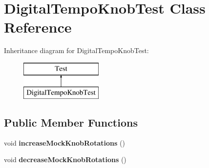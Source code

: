 \hypertarget{class_digital_tempo_knob_test}{}\section{Digital\+Tempo\+Knob\+Test Class Reference}
\label{class_digital_tempo_knob_test}
Inheritance diagram for Digital\+Tempo\+Knob\+Test\+:\begin{figure}[H]
\begin{center}
\leavevmode
\includegraphics[height=2.000000cm]{class_digital_tempo_knob_test}
\end{center}
\end{figure}
\subsection*{Public Member Functions}
\begin{DoxyCompactItemize}
\item 
\mbox{\label{class_digital_tempo_knob_test_aae7be94aeaa13fee37e7406fd2617886}} 
void {\bfseries increase\+Mock\+Knob\+Rotations} ()
\item 
\mbox{\label{class_digital_tempo_knob_test_a99015e4f13c986a9c6ac619c7b0ad9ce}} 
void {\bfseries decrease\+Mock\+Knob\+Rotations} ()
\end{DoxyCompactItemize}
